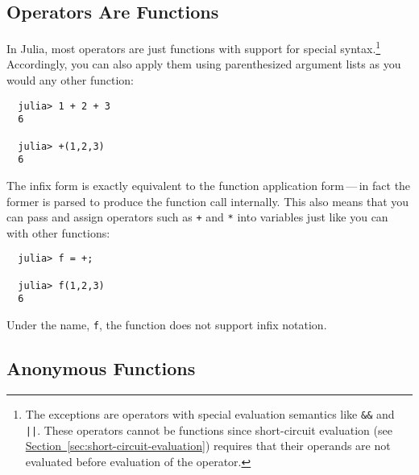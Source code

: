 \documentclass{article}
\renewcommand{\sec}[1]{\label{sec:#1}}
\newcommand{\Section}[1]{\hyperref[sec:#1]{Section~\ref*{sec:#1}}}
\begin{document}
\subsection{Operators Are Functions}\sec{operators-are-functions}

In Julia, most operators are just functions with support for special syntax.\footnote{The exceptions are operators with special evaluation semantics like \texttt{\&\&} and \texttt{||}.
These operators cannot be functions since short-circuit evaluation (see \Section{short-circuit-evaluation}) requires that their operands are not evaluated before evaluation of the operator.}
Accordingly, you can also apply them using parenthesized argument lists as you would any other function:
\begin{verbatim}
  julia> 1 + 2 + 3
  6

  julia> +(1,2,3)
  6
\end{verbatim}
The infix form is exactly equivalent to the function application form\,---\,in fact the former is parsed to produce the function call internally.
This also means that you can pass and assign operators such as \verb|+| and \verb|*| into variables just like you can with other functions:
\begin{verbatim}
  julia> f = +;

  julia> f(1,2,3)
  6
\end{verbatim}
Under the name, \verb|f|, the function does not support infix notation.


\subsection{Anonymous Functions}\sec{anonymous-functions}
\end{document}
